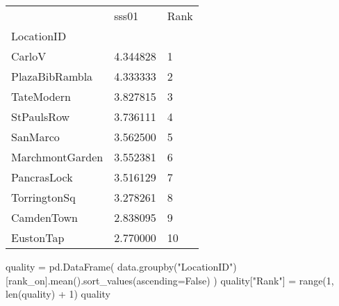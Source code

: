 \documentclass[
  letterpaper,
  DIV=11,
  numbers=noendperiod]{scrartcl}
\newenvironment{Shaded}{\begin{snugshade}}{\end{snugshade}}
\newcommand{\BuiltInTok}[1]{\textcolor[rgb]{0.00,0.23,0.31}{#1}}
\newcommand{\DecValTok}[1]{\textcolor[rgb]{0.68,0.00,0.00}{#1}}
\newcommand{\NormalTok}[1]{\textcolor[rgb]{0.00,0.23,0.31}{#1}}
\newcommand{\OperatorTok}[1]{\textcolor[rgb]{0.37,0.37,0.37}{#1}}
\newcommand{\StringTok}[1]{\textcolor[rgb]{0.13,0.47,0.30}{#1}}
\newcommand{\VariableTok}[1]{\textcolor[rgb]{0.07,0.07,0.07}{#1}}
\begin{document}
\begin{longtable}[]{@{}lll@{}}
\toprule\noalign{}
& sss01 & Rank \\
LocationID & & \\
\midrule\noalign{}
\endhead
\bottomrule\noalign{}
\endlastfoot
CarloV & 4.344828 & 1 \\
PlazaBibRambla & 4.333333 & 2 \\
TateModern & 3.827815 & 3 \\
StPaulsRow & 3.736111 & 4 \\
SanMarco & 3.562500 & 5 \\
MarchmontGarden & 3.552381 & 6 \\
PancrasLock & 3.516129 & 7 \\
TorringtonSq & 3.278261 & 8 \\
CamdenTown & 2.838095 & 9 \\
EustonTap & 2.770000 & 10 \\
\end{longtable}

\begin{Shaded}
\begin{Highlighting}[]
\NormalTok{quality }\OperatorTok{=}\NormalTok{ pd.DataFrame(}
\NormalTok{    data.groupby(}\StringTok{"LocationID"}\NormalTok{)[rank\_on].mean().sort\_values(ascending}\OperatorTok{=}\VariableTok{False}\NormalTok{)}
\NormalTok{)}
\NormalTok{quality[}\StringTok{"Rank"}\NormalTok{] }\OperatorTok{=} \BuiltInTok{range}\NormalTok{(}\DecValTok{1}\NormalTok{, }\BuiltInTok{len}\NormalTok{(quality) }\OperatorTok{+} \DecValTok{1}\NormalTok{)}
\NormalTok{quality}
\end{Highlighting}
\end{Shaded}
\end{document}
